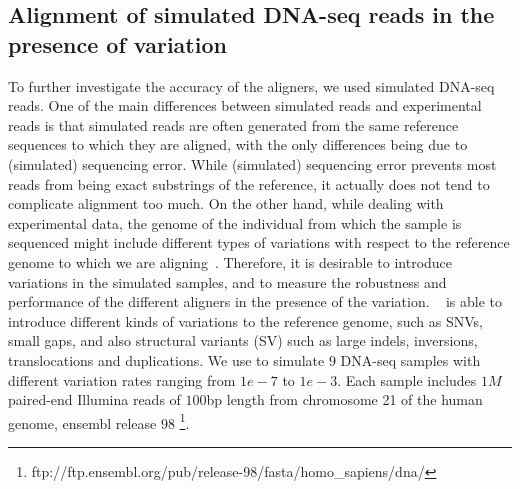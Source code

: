 \subsection{Alignment of simulated DNA-seq reads in the presence of variation}

To further investigate the accuracy of the aligners, we used simulated DNA-seq reads. One of the main 
differences between simulated reads and experimental reads is that simulated reads are often generated 
from the same reference sequences to which they are aligned, with the only differences being due to 
(simulated) sequencing error.  While (simulated) sequencing error prevents most reads from being exact 
substrings of the reference, it actually does not tend to complicate alignment too much.
On the other hand, while dealing with experimental data, the genome of the individual from which
the sample is sequenced might include different types of variations with respect to the reference 
genome to which we are aligning~\citep{srivastava2019alignment}. Therefore, it is desirable to introduce 
variations in the simulated samples, and to measure the robustness and performance of the different 
aligners in the presence of the variation. \mason~\citep{holtgrewe2010mason} is able to introduce different 
kinds of variations to the reference genome, such as SNVs, small gaps, and also structural variants (SV) 
such as large indels, inversions, translocations and duplications. We use \mason to simulate $9$ DNA-seq 
samples with different variation rates ranging from $1e-7$ to $1e-3$. Each sample includes $1M$ paired-end 
Illumina reads of $100$bp length from chromosome 21 of the human genome, ensembl release 98
\footnote{ftp://ftp.ensembl.org/pub/release-98/fasta/homo\_sapiens/dna/}. 

